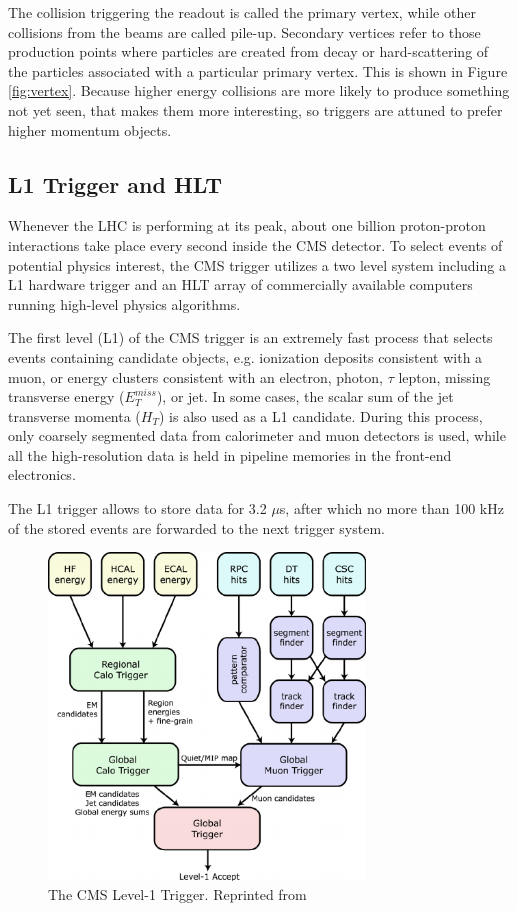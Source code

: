  The collision triggering the readout is called the primary vertex, while other collisions from the beams are called pile-up. Secondary vertices refer to those production points where particles are created from decay or hard-scattering of the particles associated with a particular primary vertex. This is shown in Figure \ref{fig:vertex}. Because higher energy collisions are more likely to produce something not yet seen, that makes them more interesting, so triggers are attuned to prefer higher momentum objects.

\subsection{L1 Trigger and HLT}
 Whenever the LHC is performing at its peak, about one billion proton-proton interactions take place every second inside the CMS detector. To select events of potential physics interest, the CMS trigger\cite{Khachatryan_2017} utilizes a two level system including a L1 hardware trigger and an HLT array of commercially available computers running high-level physics algorithms.

The first level (L1) of the CMS trigger is an extremely fast process that selects events containing candidate objects, e.g. ionization deposits consistent with a muon, or energy clusters consistent with an electron, photon, $\tau$ lepton, missing transverse energy ($E_{T}^{miss}$), or jet. In some cases, the scalar sum of the jet transverse momenta ($H_{T}$) is also used as a L1 candidate. During this process, only coarsely segmented data from calorimeter and muon detectors is used, while all the high-resolution data is held in pipeline memories in the front-end electronics.

 The L1 trigger allows to store data for 3.2 $\mu$s, after which no more than 100 kHz of the stored events are forwarded to the next trigger system.  

 \begin{figure}[h]
 	\centering
 	\includegraphics[width=0.75\textwidth]{figures/The-CMS-Level-1-Trigger.png}
 	\singlespace
 	\caption{The CMS Level-1 Trigger. Reprinted from \cite{cmsglobaltrigger}}
 	\label{fig:l1trig}
 \end{figure}

